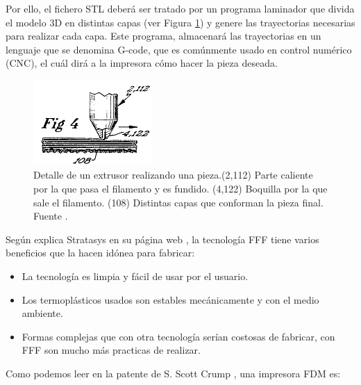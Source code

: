 Por ello, el fichero STL deberá ser tratado por un programa laminador que divida el modelo 3D en distintas capas (ver Figura \ref{fig:detalle_capas}) y genere las trayectorias necesarias para realizar cada capa. Este programa, almacenará las trayectorias en un lenguaje que se denomina G-code, que es comúnmente usado en control numérico (CNC), el cuál dirá a la impresora cómo hacer la pieza deseada.

\begin{figure}[!ht]
    \centering
    \includegraphics[width=0.4\textwidth]{images/capas_fdm.png}
    \caption[Detalle  de un extrusor realizando una pieza.]{Detalle  de un extrusor realizando una pieza.(2,112) Parte caliente por la que pasa el filamento y es fundido. (4,122) Boquilla por la que sale el filamento. (108) Distintas capas que conforman la pieza final. Fuente \cite{crump1992apparatus}.}
    \label{fig:detalle_capas}
\end{figure}

Según explica Stratasys en su página web \cite{FDMTechnology}, la tecnología FFF tiene varios beneficios que la hacen idónea para fabricar:

\begin{itemize}
    \item La tecnología es limpia y fácil de usar por el usuario.
    \item Los termoplásticos usados son estables mecánicamente y con el medio ambiente.
    \item Formas complejas que con otra tecnología serían costosas de fabricar, con FFF son mucho más practicas de realizar.
\end{itemize}

Como podemos leer en la patente de S. Scott Crump \cite{crump1992apparatus}, una impresora FDM es:


